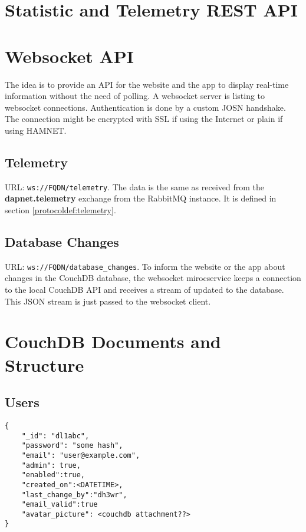\section{Statistic and Telemetry REST API}

\section{Websocket API}
\label{protocoldef:websocketapi}
The idea is to provide an API for the website and the app to display real-time information without the need of polling. A websocket server is listing to websocket connections. Authentication is done by a custom JOSN handshake. The connection might be encrypted with SSL if using the Internet or plain if using HAMNET.

\subsection{Telemetry}
\label{protcoldef:websocketapi:telemetry}
URL: \texttt{ws://FQDN/telemetry}.
The data is the same as received from the \textbf{dapnet.telemetry} exchange from the RabbitMQ instance. It is defined in section \ref{protocoldef:telemetry}.

\subsection{Database Changes}
\label{protcoldef:websocketapi:database_changes}
URL: \texttt{ws://FQDN/database_changes}.
To inform the website or the app about changes in the CouchDB database, the websocket mirocservice keeps a connection to the local CouchDB API and receives a stream of updated to the database. This JSON stream is just passed to the websocket client.

\section{CouchDB Documents and Structure}
\subsection{Users}

\begin{lstlisting}
{
	"_id": "dl1abc",
	"password": "some hash",
    "email": "user@example.com",
    "admin": true,
    "enabled":true,
    "created_on":<DATETIME>,
    "last_change_by":"dh3wr",
    "email_valid":true
    "avatar_picture": <couchdb attachment??>
}
\end{lstlisting}


